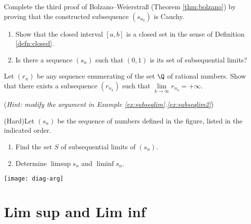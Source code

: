\begin{exercisessec}{}{}
\begin{enumerate}
		
		\item\label{exs:bolzano} Complete the third proof of Bolzano--Weierstraß (Theorem \ref{thm:bolzano})  by proving that the constructed subsequence $(s_{n_k})$ is Cauchy.
  
  
  	\item%
  	\begin{enumerate}
  		\item Show that the closed interval $[a,b]$ is a closed set in the sense of Definition \ref{defn:closed}.
  		\item Is there a sequence $(s_n)$ such that $(0,1)$ is its set of subsequential limits?
  	\end{enumerate}
  
  
  	\item%
  	Let $(r_n)$ be any sequence enumerating of the set $\Q$ of rational numbers. Show that there exists a subsequence $(r_{n_k})$ such that $\lim\limits_{k\to\infty}r_{n_k}=+\infty$.\par
  	(\emph{Hint: modify the argument in Example \ref*{ex:subseqlim}.\ref{ex:subseqlim2}})
  
  
  	\begin{minipage}[t]{0.55\linewidth}\vspace{0pt}
  	\item%
  	(Hard)\lstsp Let $(s_n)$ be the sequence of numbers defined in the figure, listed in the indicated order.
  	\begin{enumerate}
		  \item Find the set $S$ of subsequential limits of $(s_n)$.
		  \item Determine $\limsup s_n$ and $\liminf s_n$.
	  \end{enumerate}
  	\end{minipage}\begin{minipage}[t]{0.44\linewidth}\vspace{0pt}
  		\hfill\texttt{[image: diag-arg]}
  	\end{minipage}
  
  


	\end{enumerate}
\end{exercisessec}

\clearpage


\section{Lim sup and Lim inf}

